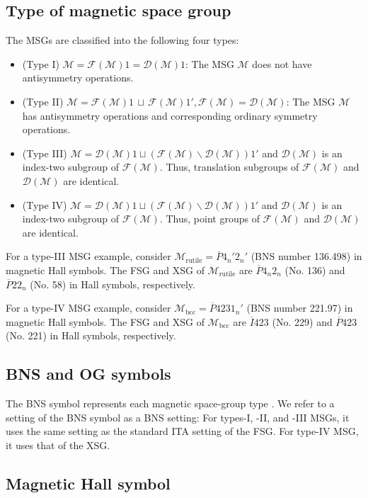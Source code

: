 \subsection{Type of magnetic space group}

The MSGs are classified into the following four types:
\begin{itemize}
  \item (Type I)
    $\mathcal{M} = \mathcal{F}(\mathcal{M})1 = \mathcal{D}(\mathcal{M})1$:
    The MSG $\mathcal{M}$ does not have antisymmetry operations.
  \item (Type II)
    $\mathcal{M} = \mathcal{F}(\mathcal{M})1 \,\sqcup\, \mathcal{F}(\mathcal{M})1', \mathcal{F}(\mathcal{M}) = \mathcal{D}(\mathcal{M})$:
    The MSG $\mathcal{M}$ has antisymmetry operations and corresponding ordinary symmetry operations.
  \item (Type III)
    $\mathcal{M} = \mathcal{D}(\mathcal{M})1 \sqcup (\mathcal{F}(\mathcal{M}) \backslash \mathcal{D}(\mathcal{M})) 1'$ and $\mathcal{D}(\mathcal{M})$ is an index-two  subgroup of $\mathcal{F}(\mathcal{M})$.
    Thus, translation subgroups of $\mathcal{F}(\mathcal{M})$ and $\mathcal{D}(\mathcal{M})$ are identical.
  \item (Type IV)
    $\mathcal{M} = \mathcal{D}(\mathcal{M})1 \sqcup (\mathcal{F}(\mathcal{M}) \backslash \mathcal{D}(\mathcal{M})) 1'$ and $\mathcal{D}(\mathcal{M})$ is an index-two  subgroup of $\mathcal{F}(\mathcal{M})$.
    Thus, point groups of $\mathcal{F}(\mathcal{M})$ and $\mathcal{D}(\mathcal{M})$ are identical.
\end{itemize}

For a type-III MSG example, consider $\mathcal{M}_{\mathrm{rutile}} = \overline{P}4_{n}'2_{n}'$ (BNS number 136.498) in magnetic Hall symbols.
The FSG and XSG of $\mathcal{M}_{\mathrm{rutile}}$ are $\overline{P}4_{n}2_{n}$ (No. 136) and $\overline{P}22_{n}$ (No. 58) in Hall symbols, respectively.

For a type-IV MSG example, consider $\mathcal{M}_{\mathrm{bcc}} = \overline{P}4231_{n}'$ (BNS number 221.97) in magnetic Hall symbols.
The FSG and XSG of $\mathcal{M}_{\mathrm{bcc}}$ are $\overline{I}423$ (No. 229) and $\overline{P}423$ (No. 221) in Hall symbols, respectively.

\subsection{BNS and OG symbols}

The BNS symbol represents each magnetic space-group type \cite{belov1957neronova}.
We refer to a setting of the BNS symbol as a BNS setting: For types-I, -II, and -III MSGs, it uses the same setting as the standard ITA setting of the FSG.
For type-IV MSG, it uses that of the XSG.


\subsection{Magnetic Hall symbol}
